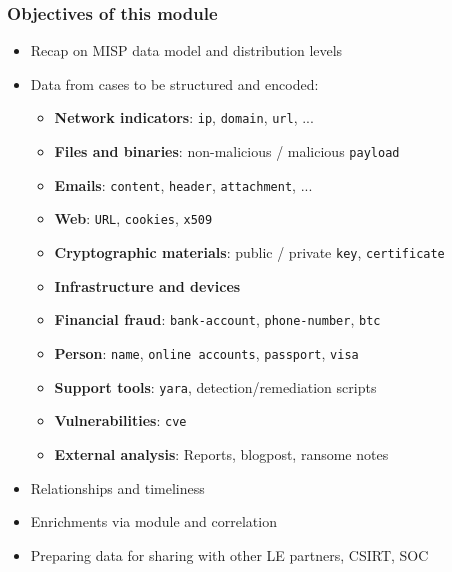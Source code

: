 
\begin{frame}[t,plain]
\titlepage
\end{frame}

\begin{frame}
    \frametitle{Objectives of this module}
    \begin{itemize}
        \item Recap on MISP data model and distribution levels
        \item Data from cases to be structured and encoded:
        \begin{itemize}
            \item \textbf{Network indicators}: \texttt{ip}, \texttt{domain}, \texttt{url}, ...
            \item \textbf{Files and binaries}: non-malicious / malicious \texttt{payload}
            \item \textbf{Emails}: \texttt{content}, \texttt{header}, \texttt{attachment}, ...
            \item \textbf{Web}: \texttt{URL}, \texttt{cookies}, \texttt{x509}
            \item \textbf{Cryptographic materials}: public / private \texttt{key}, \texttt{certificate}
            \item \textbf{Infrastructure and devices}
            \item \textbf{Financial fraud}: \texttt{bank-account}, \texttt{phone-number}, \texttt{btc}
            \item \textbf{Person}: \texttt{name}, \texttt{online accounts}, \texttt{passport}, \texttt{visa}
            \item \textbf{Support tools}: \texttt{yara}, detection/remediation scripts
            \item \textbf{Vulnerabilities}: \texttt{cve}
            \item \textbf{External analysis}: Reports, blogpost, ransome notes
        \end{itemize}
        \item Relationships and timeliness
        \item Enrichments via module and correlation
        \item Preparing data for sharing with other LE partners, CSIRT, SOC
    \end{itemize}
\end{frame}

